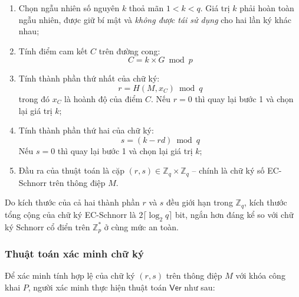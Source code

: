 \begin{enumerate}
    \item Chọn ngẫu nhiên số nguyên $k$ thoả mãn $1 < k < q$. Giá trị $k$ phải hoàn toàn ngẫu nhiên, được giữ bí mật và \textit{không được tái sử dụng} cho hai lần ký khác nhau;
    \item Tính điểm cam kết $C$ trên đường cong:
    \begin{equation}
        C = k \times G \bmod p
        \label{eq:ec-schnorr-sign-c}
    \end{equation}
    \item Tính thành phần thứ nhất của chữ ký:
    \begin{equation}
        r = H(M, x_C) \bmod q
        \label{eq:ec-schnorr-sign-r}
    \end{equation}
    trong đó $x_C$ là hoành độ của điểm $C$. Nếu $r = 0$ thì quay lại bước 1 và chọn lại giá trị $k$;
    \item Tính thành phần thứ hai của chữ ký:
    \begin{equation}
        s = (k - r d) \bmod q
        \label{eq:ec-schnorr-sign-s}
    \end{equation}
    Nếu $s = 0$ thì quay lại bước 1 và chọn lại giá trị $k$;
    \item Đầu ra của thuật toán là cặp $(r, s) \in \mathbb{Z}_q \times \mathbb{Z}_q$ -- chính là chữ ký số EC-Schnorr trên thông điệp $M$.
\end{enumerate}

Do kích thước của cả hai thành phần $r$ và $s$ đều giới hạn trong $\mathbb{Z}_q$, kích thước tổng cộng của chữ ký EC-Schnorr là $2 \lceil \log_2 q \rceil$ bit, ngắn hơn đáng kể so với chữ ký Schnorr cổ điển trên $\mathbb{Z}_p^*$ ở cùng mức an toàn.

\subsubsection{Thuật toán xác minh chữ ký}

Để xác minh tính hợp lệ của chữ ký $(r, s)$ trên thông điệp $M$ với khóa công khai $P$, người xác minh thực hiện thuật toán $\textsf{Ver}$ như sau:

